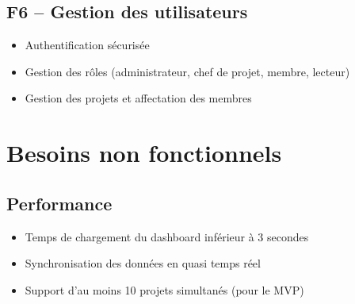 \documentclass[12pt,a4paper]{article}
\begin{document}
\subsection{F6 -- Gestion des utilisateurs}
\begin{itemize}[leftmargin=2cm, itemsep=3pt]
    \item[\textcolor{accent}{$\blacktriangleright$}] Authentification s\'ecuris\'ee
    \item[\textcolor{accent}{$\blacktriangleright$}] Gestion des r\^oles (administrateur, chef de projet, membre, lecteur)
    \item[\textcolor{accent}{$\blacktriangleright$}] Gestion des projets et affectation des membres
\end{itemize}

\section{Besoins non fonctionnels}

\vspace{0.3cm}
\begin{center}
\end{center}
\vspace{0.3cm}

\subsection{Performance}
\begin{itemize}[leftmargin=2cm, itemsep=3pt]
    \item[\textcolor{accent}{$\blacktriangleright$}] Temps de chargement du dashboard inf\'erieur \`a 3 secondes
    \item[\textcolor{accent}{$\blacktriangleright$}] Synchronisation des donn\'ees en quasi temps r\'eel
    \item[\textcolor{accent}{$\blacktriangleright$}] Support d'au moins 10 projets simultan\'es (pour le MVP)
\end{itemize}
\end{document}
